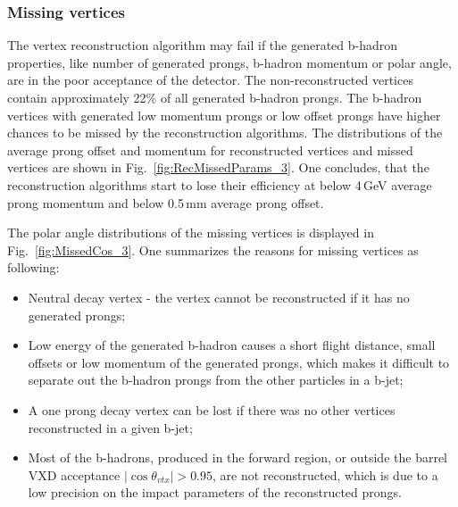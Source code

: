 \subsubsection{Missing vertices}
\label{sec:MisVertices}
The vertex reconstruction algorithm may fail if the generated b-hadron properties, like number of generated prongs, b-hadron momentum or polar angle, are in the poor acceptance of the detector. 
The non-reconstructed vertices contain approximately 22\% of all generated b-hadron prongs. 
The b-hadron vertices with generated low momentum prongs or low offset prongs have higher chances to be missed by the reconstruction algorithms. 
The distributions of the average prong offset and momentum for reconstructed vertices and missed vertices are shown in Fig.~\ref{fig:RecMissedParams_3}. 
One concludes, that the reconstruction algorithms start to lose their efficiency at below 4\,GeV average prong momentum and below 0.5\,mm average prong offset. 


The polar angle distributions of the missing vertices is displayed in Fig.~\ref{fig:MissedCos_3}. 
One summarizes the reasons for missing vertices as following: 
\begin{itemize}
\item Neutral decay vertex - the vertex cannot be reconstructed if it has no generated prongs;
\item Low energy of the generated b-hadron causes a short flight distance, small offsets or low momentum of the generated prongs, which makes it difficult to separate out the b-hadron prongs from the other particles in a b-jet;
\item A one prong decay vertex can be lost if there was no other vertices reconstructed in a given b-jet;
\item Most of the b-hadrons, produced in the forward region, or outside the barrel VXD acceptance $|\cos\theta_{vtx}| > 0.95$, are not reconstructed, which is due to a low precision on the impact parameters of the reconstructed prongs. 
\end{itemize}

